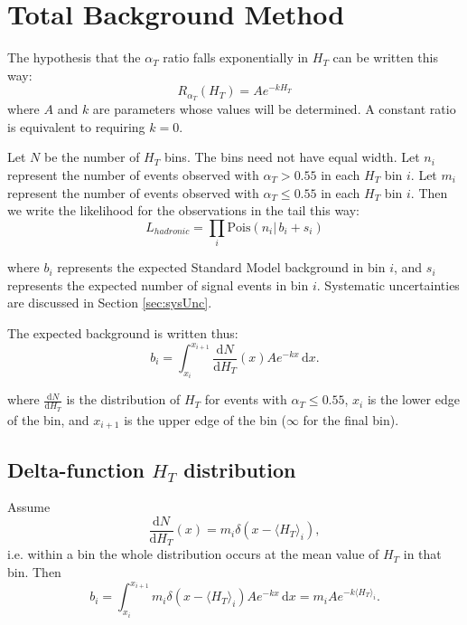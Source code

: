 \section{Total Background Method}
\label{sec:totalBackground}
The hypothesis that the $\alpha_{T}$ ratio falls exponentially in $H_T$ can be written this way:
\begin{equation}
R_{\alpha_{T}}(H_T) = A e^{-k H_T}
\end{equation}
where $A$ and $k$ are parameters whose values will be determined.  A constant ratio is equivalent to requiring $k=0$.

Let $N$ be the number of $H_T$ bins.  The bins need not have equal width.
Let $n_i$ represent the number of events observed with $\alpha_{T} > 0.55$ in each $H_T$ bin $i$.
Let $m_i$ represent the number of events observed with $\alpha_{T} \le 0.55$ in each $H_T$ bin $i$.
Then we write the likelihood for the observations in the tail this way:
\begin{equation}
L_{hadronic}=\prod_i \mathrm{Pois}(n_i |\, b_i + s_i)
\end{equation}

where $b_i$ represents the expected Standard Model background in bin $i$, 
and $s_i$ represents the expected number of signal events in bin $i$.
Systematic uncertainties are discussed in Section \ref{sec:sysUnc}.

The expected background is written thus:
\begin{equation}
b_i = \int_{x_i}^{x_{i+1}}\! \frac{\mathrm{d}N}{\mathrm{d}H_T}(x) A e^{-k x}\, \mathrm{d}x.
\end{equation}

where $\frac{\mathrm{d}N}{\mathrm{d}H_T}$ is the distribution of $H_T$ for events with $\alpha_{T} \le 0.55$,
$x_i$ is the lower edge of the bin, and $x_{i+1}$ is the upper edge of the bin ($\infty$ for the final bin).

\subsection{Delta-function $H_T$ distribution}
\label{sec:diracDeltaHt}
Assume
\begin{equation}
\frac{\mathrm{d}N}{\mathrm{d}H_T}(x) = m_{i}\delta(x-\langle H_T \rangle_i),
\end{equation}
i.e. within a bin the whole distribution occurs at the mean value of $H_T$ in that bin.
Then
\begin{equation}
b_i = \int_{x_i}^{x_{i+1}}\! m_{i}\delta(x-\langle H_T \rangle_i) Ae^{-kx}\, \mathrm{d}x = m_{i} Ae^{-k \langle H_T \rangle_i}.
\label{eq:biDirac}
\end{equation}

